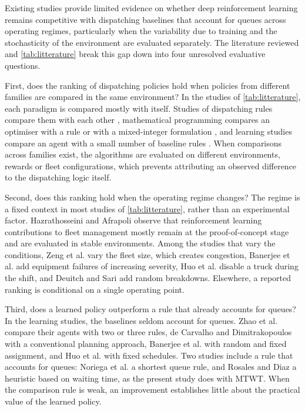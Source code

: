 \documentclass[11pt,a4paper]{article}
\newif\ifrevmarks
\newcommand{\revtag}[1]{\ifrevmarks\textsuperscript{\textcolor{red!70!black}{\scriptsize[#1]}}\fi}
\newenvironment{revbloc}[1]{\par\ifrevmarks\color{revcolor}\noindent\revtag{#1}\ \fi}{\par}
\newif\ifcorrmarks
\newcommand{\corr}[1]{\ifcorrmarks\textcolor{corrcolor}{#1}\else#1\fi}
\begin{document}
\begin{revbloc}{M24 (merger of §1.3, §2.4, §3)}
\corr{Existing studies provide limited evidence on whether deep reinforcement learning remains competitive with dispatching baselines that account for queues across operating regimes, particularly when the variability due to training and the stochasticity of the environment are evaluated separately. The literature reviewed and \cref{tab:litterature} break this gap down into four unresolved evaluative questions.}

\corr{First, does the ranking of dispatching policies hold when policies from different families are compared in the same environment?} \corr{In the studies of \cref{tab:litterature}, each paradigm is compared mostly with itself.} Studies of dispatching rules compare them with each other \cite{Alarie2002, MehrnazMohtasham2023, Zeng2022}, mathematical programming compares an optimiser with a rule or with a mixed-integer formulation \cite{Soumis1989, AmandaSmith2020}, and learning studies compare an agent with a small number of baseline rules \cite{deCarvalho2023, Zhao2025}. When comparisons across families exist, the algorithms are evaluated on different environments, rewards or fleet configurations, which prevents attributing an observed difference to the dispatching logic itself.

\corr{Second, does this ranking hold when the operating regime changes? The regime} \corr{is a fixed context in most studies of \cref{tab:litterature}, rather than an experimental factor. Hazrathosseini and Afrapoli \cite{Hazrathosseini2024} observe that reinforcement learning contributions to fleet management mostly remain at the proof-of-concept stage and are evaluated in stable environments. Among the studies that vary the conditions, Zeng et al. \cite{Zeng2022} vary the fleet size, which creates congestion, Banerjee et al. \cite{Banerjee2025} add equipment failures of increasing severity, Huo et al. \cite{Huo2024} disable a truck during the shift, and Deuitch and Sari \cite{Deuitch2026} add random breakdowns. Elsewhere, a reported ranking is conditional on a single operating point.}

\corr{Third, does a learned policy outperform a rule that already accounts for queues? In the learning studies, the baselines seldom account for queues.} \corr{Zhao et al. \cite{Zhao2025} compare their agents with two or three rules, de Carvalho and Dimitrakopoulos \cite{deCarvalho2023} with a conventional planning approach, Banerjee et al. \cite{Banerjee2025} with random and fixed assignment, and Huo et al. \cite{Huo2024} with fixed schedules. Two studies include a rule that accounts for queues: Noriega et al. \cite{Noriega2025} a shortest queue rule, and Rosales and Diaz \cite{FranciscoRosales2025} a heuristic based on waiting time, as the present study does with MTWT.} When the comparison rule is weak, an improvement establishes little about the practical value of the learned policy.


\end{revbloc}
\end{document}
